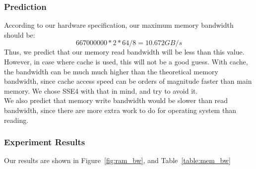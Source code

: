 \documentclass{article} %
\begin{document}
\subsubsection{Prediction}
According to our hardware specification, our maximum memory bandwidth should be:\\
$$ 667000000 * 2 * 64 / 8 = 10.672GB/s $$
Thus, we predict that our memory read bandwidth will be less than this value.\\
However, in case where cache is used, this will not be a good guess. With cache, the bandwidth can be much much higher than the theoretical memory bandwidth, since cache access speed can be orders of magnitude faster than main memory. We chose SSE4 with that in mind, and try to avoid it.\\
We also predict that memory write bandwidth would be slower than read bandwidth, since there are more extra work to do for operating system than reading.\\

\subsubsection{Experiment Results}
Our results are shown in Figure~\ref{fig:ram_bw}, and Table~\ref{table:mem_bw} \\
\end{document}
